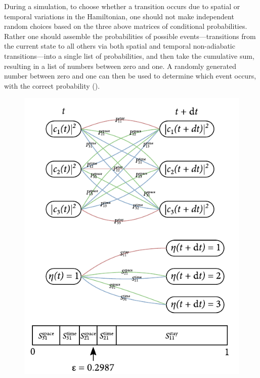 During a simulation, to choose whether a transition occurs due to spatial or temporal variations in the Hamiltonian, one should not make independent random choices based on the three above matrices of conditional probabilities. Rather one should assemble the probabilities of possible events---transitions from the current state to all others via both spatial and temporal non-adiabatic transitions---into a single list of probabilities, and then take the cumulative sum, resulting in a list of numbers between zero and one. A randomly generated number between zero and one can then be used to determine which event occurs, with the correct probability ().

\begin{figure}[t]
    \centerfloat
    \includegraphics{figures/hidden_variables/random_choice.pdf}

\end{figure}

